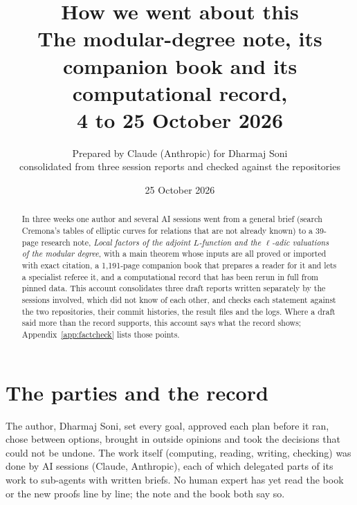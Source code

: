 \documentclass[11pt,a4paper]{article}
\title{How we went about this\\[3pt]\large The modular-degree note, its companion book and its computational record,\\ 4 to 25 October 2026}
\author{Prepared by Claude (Anthropic) for Dharmaj Soni\\ consolidated from three session reports and checked against the repositories}
\date{25 October 2026}
\begin{document}
\maketitle\sloppy

\begin{abstract}
\noindent In three weeks one author and several AI sessions went from a general brief (search Cremona's tables of elliptic curves for relations that are not already known) to a 39-page research note, \emph{Local factors of the adjoint $L$-function and the $\ell$-adic valuations of the modular degree}, with a main theorem whose inputs are all proved or imported with exact citation, a 1,191-page companion book that prepares a reader for it and lets a specialist referee it, and a computational record that has been rerun in full from pinned data. This account consolidates three draft reports written separately by the sessions involved, which did not know of each other, and checks each statement against the two repositories, their commit histories, the result files and the logs. Where a draft said more than the record supports, this account says what the record shows; Appendix~\ref{app:factcheck} lists those points.
\end{abstract}

\tableofcontents

\section{The parties and the record}\label{sec:parties}
The author, Dharmaj Soni, set every goal, approved each plan before it ran, chose between options, brought in outside opinions and took the decisions that could not be undone. The work itself (computing, reading, writing, checking) was done by AI sessions (Claude, Anthropic), each of which delegated parts of its work to sub-agents with written briefs. No human expert has yet read the book or the new proofs line by line; the note and the book both say so.
\end{document}
